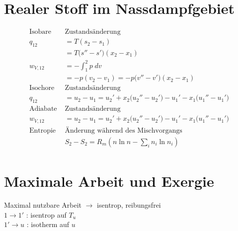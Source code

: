 \documentclass[twocolumn]{article}
\begin{document}
\section{Realer Stoff im Nassdampfgebiet}
\begin{align*}
	\text{Isobare } &\text{Zustandsänderung} \\
	q_{12} &= T(s_2 - s_1) \\
	&= T\Big(s'' - s'\Big)(x_2-x_1) \\
	w_{V,12} &= - \int_{1}^{2} p\; dv \\
	&= -p(v_2-v_1) = -p\Big(v'' -v'\Big)(x_2-x_1) \\
	\text{Isochore } &\text{Zustandsänderung} \\
	q_{12} &= u_2 - u_1 = u_2' + x_2\Big(u_2'' - u_2' \Big) - u_1' - x_1\Big(u_1'' - u_1'\Big) \\
	\text{Adiabate } &\text{Zustandsänderung} \\
	w_{V,12} &= u_2 - u_1 = u_2' + x_2 \Big( u_2'' - u_2' \Big) - u_1' - x_1\Big(u_1'' - u_1'\Big) \\
	\text{Entropie} & \text{Änderung während des Mischvorgangs} \\
	&S_2-S_2 = R_m \left ( n \ln n - \sum_{i}^{} n_i \ln n_i \right ) \\
\end{align*}


\section{Maximale Arbeit und Exergie}
Maximal nutzbare Arbeit $\rightarrow$ isentrop, reibungsfrei \\
$1 \rightarrow 1'$ : isentrop auf $T_u$ \\
$1' \rightarrow u$ : isotherm auf $u$ 
\end{document}
